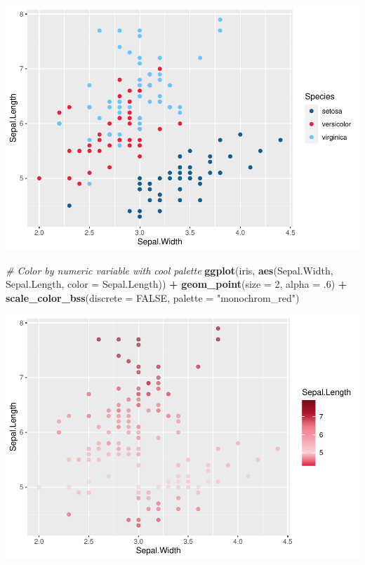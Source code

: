 \documentclass[
]{article}
\newenvironment{Shaded}{\begin{snugshade}}{\end{snugshade}}
\newcommand{\CommentTok}[1]{\textcolor[rgb]{0.56,0.35,0.01}{\textit{#1}}}
\newcommand{\DataTypeTok}[1]{\textcolor[rgb]{0.13,0.29,0.53}{#1}}
\newcommand{\DecValTok}[1]{\textcolor[rgb]{0.00,0.00,0.81}{#1}}
\newcommand{\FloatTok}[1]{\textcolor[rgb]{0.00,0.00,0.81}{#1}}
\newcommand{\KeywordTok}[1]{\textcolor[rgb]{0.13,0.29,0.53}{\textbf{#1}}}
\newcommand{\NormalTok}[1]{#1}
\newcommand{\OperatorTok}[1]{\textcolor[rgb]{0.81,0.36,0.00}{\textbf{#1}}}
\newcommand{\OtherTok}[1]{\textcolor[rgb]{0.56,0.35,0.01}{#1}}
\newcommand{\StringTok}[1]{\textcolor[rgb]{0.31,0.60,0.02}{#1}}
\begin{document}
\includegraphics[width=1\linewidth]{man/figures/README-scale_color_bss-1}

\begin{Shaded}
\begin{Highlighting}[]

\CommentTok{\# Color by numeric variable with cool palette}
\KeywordTok{ggplot}\NormalTok{(iris, }\KeywordTok{aes}\NormalTok{(Sepal.Width, Sepal.Length, }\DataTypeTok{color =}\NormalTok{ Sepal.Length)) }\OperatorTok{+}
\StringTok{  }\KeywordTok{geom\_point}\NormalTok{(}\DataTypeTok{size =} \DecValTok{2}\NormalTok{, }\DataTypeTok{alpha =} \FloatTok{.6}\NormalTok{) }\OperatorTok{+}
\StringTok{  }\KeywordTok{scale\_color\_bss}\NormalTok{(}\DataTypeTok{discrete =} \OtherTok{FALSE}\NormalTok{, }\DataTypeTok{palette =} \StringTok{"monochrom\_red"}\NormalTok{)}
\end{Highlighting}
\end{Shaded}

\includegraphics[width=1\linewidth]{man/figures/README-scale_color_bss-2}
\end{document}
